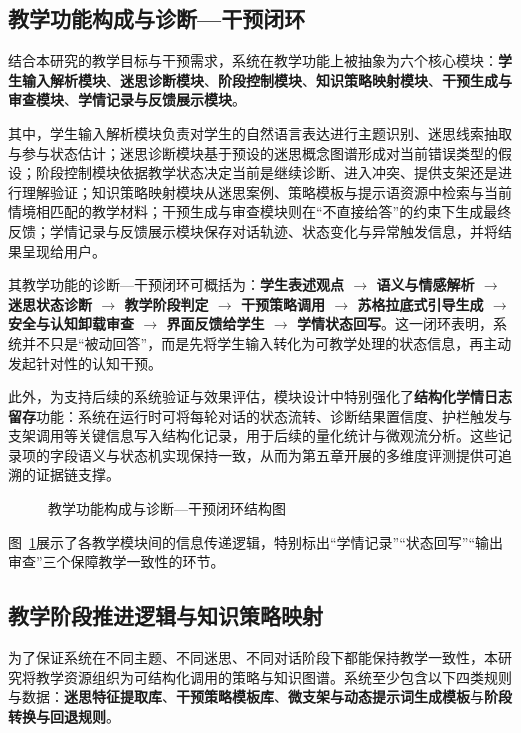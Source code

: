 \subsection{教学功能构成与诊断—干预闭环}
\label{sec:4.5.1}

结合本研究的教学目标与干预需求，系统在教学功能上被抽象为六个核心模块：\textbf{学生输入解析模块}、\textbf{迷思诊断模块}、\textbf{阶段控制模块}、\textbf{知识策略映射模块}、\textbf{干预生成与审查模块}、\textbf{学情记录与反馈展示模块}。

其中，学生输入解析模块负责对学生的自然语言表达进行主题识别、迷思线索抽取与参与状态估计；迷思诊断模块基于预设的迷思概念图谱形成对当前错误类型的假设；阶段控制模块依据教学状态决定当前是继续诊断、进入冲突、提供支架还是进行理解验证；知识策略映射模块从迷思案例、策略模板与提示语资源中检索与当前情境相匹配的教学材料；干预生成与审查模块则在“不直接给答”的约束下生成最终反馈；学情记录与反馈展示模块保存对话轨迹、状态变化与异常触发信息，并将结果呈现给用户。

其教学功能的诊断—干预闭环可概括为：\textbf{学生表述观点 $\rightarrow$ 语义与情感解析 $\rightarrow$ 迷思状态诊断 $\rightarrow$ 教学阶段判定 $\rightarrow$ 干预策略调用 $\rightarrow$ 苏格拉底式引导生成 $\rightarrow$ 安全与认知卸载审查 $\rightarrow$ 界面反馈给学生 $\rightarrow$ 学情状态回写}。这一闭环表明，系统并不只是“被动回答”，而是先将学生输入转化为可教学处理的状态信息，再主动发起针对性的认知干预。

此外，为支持后续的系统验证与效果评估，模块设计中特别强化了\textbf{结构化学情日志留存}功能：系统在运行时可将每轮对话的状态流转、诊断结果置信度、护栏触发与支架调用等关键信息写入结构化记录，用于后续的量化统计与微观流分析。这些记录项的字段语义与状态机实现保持一致，从而为第五章开展的多维度评测提供可追溯的证据链支撑。

\begin{figure}[htbp]
    \centering
    \caption{教学功能构成与诊断—干预闭环结构图}
    \label{fig:prototype-modules}
\end{figure}

图~\ref{fig:prototype-modules}展示了各教学模块间的信息传递逻辑，特别标出“学情记录”“状态回写”“输出审查”三个保障教学一致性的环节。

\subsection{教学阶段推进逻辑与知识策略映射}
\label{sec:4.5.2}

为了保证系统在不同主题、不同迷思、不同对话阶段下都能保持教学一致性，本研究将教学资源组织为可结构化调用的策略与知识图谱。系统至少包含以下四类规则与数据：\textbf{迷思特征提取库}、\textbf{干预策略模板库}、\textbf{微支架与动态提示词生成模板}与\textbf{阶段转换与回退规则}。

